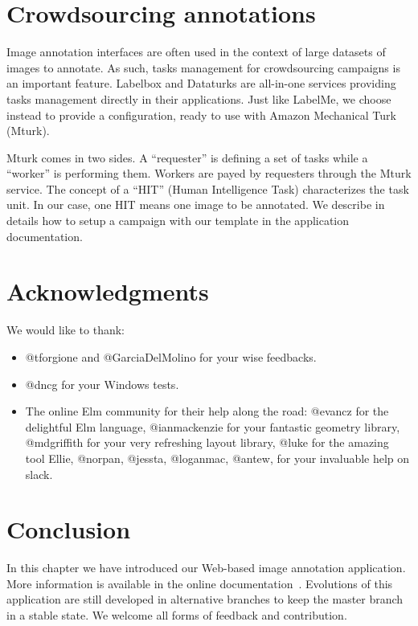 \section{Crowdsourcing annotations}

Image annotation interfaces are often used in the context
of large datasets of images to annotate.
As such, tasks management for crowdsourcing campaigns is an important feature. 
Labelbox and Dataturks are all-in-one services providing
tasks management directly in their applications.
Just like LabelMe, we choose instead to provide a configuration,
ready to use with Amazon Mechanical Turk (Mturk).

Mturk comes in two sides. A ``requester'' is defining a set of tasks
while a ``worker'' is performing them.
Workers are payed by requesters through the Mturk service.
The concept of a ``HIT'' (Human Intelligence Task) characterizes the task unit.
In our case, one HIT means one image to be annotated.
We describe in details how to setup a campaign with our template
in the application documentation.


\section{Acknowledgments}

We would like to thank:

\begin{itemize}
	\item @tforgione and @GarciaDelMolino for your wise feedbacks.
	\item @dncg for your Windows tests.
	\item The online Elm community for their help along the road:
		@evancz for the delightful Elm language,
		@ianmackenzie for your fantastic geometry library,
		@mdgriffith for your very refreshing layout library,
		@luke for the amazing tool Ellie,
		@norpan, @jessta, @loganmac, @antew, for your invaluable help on slack.
\end{itemize}


\section{Conclusion}

In this chapter we have introduced our Web-based image annotation application.
More information is available in the online documentation~\cite{annotationappdoc}.
Evolutions of this application are still developed in alternative branches to keep
the master branch in a stable state. We welcome all forms of feedback and contribution.


